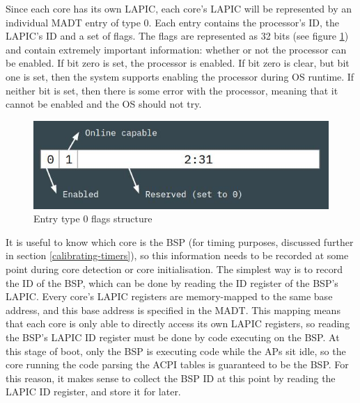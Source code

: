 \documentclass[bsc,frontabs,singlespacing,parskip,deptreport]{infthesis}
\begin{document}
Since each core has its own LAPIC, each core's LAPIC will be represented by an individual MADT entry of type 0. Each entry contains the processor's ID, the LAPIC's ID and a set of flags. The flags are represented as 32 bits (see figure \ref{entry0flags}) and contain extremely important information: whether or not the processor can be enabled. If bit zero is set, the processor is enabled. If bit zero is clear, but bit one is set, then the system supports enabling the processor during OS runtime. If neither bit is set, then there is some error with the processor, meaning that it cannot be enabled and the OS should not try.

\begin{figure}[h]
    \centering
    \includegraphics[scale=0.6]{figures/entry0flags.jpg}
    \caption{Entry type 0 flags structure}
    \label{entry0flags}
\end{figure}

It is useful to know which core is the BSP (for timing purposes, discussed further in section \ref{calibrating-timers}), so this information needs to be recorded at some point during core detection or core initialisation. The simplest way is to record the ID of the BSP, which can be done by reading the ID register of the BSP's LAPIC. Every core's LAPIC registers are memory-mapped to the same base address, and this base address is specified in the MADT. This mapping means that each core is only able to directly access its own LAPIC registers, so reading the BSP's LAPIC ID register must be done by code executing on the BSP. At this stage of boot, only the BSP is executing code while the APs sit idle, so the core running the code parsing the ACPI tables is guaranteed to be the BSP. For this reason, it makes sense to collect the BSP ID at this point by reading the LAPIC ID register, and store it for later.
\end{document}
